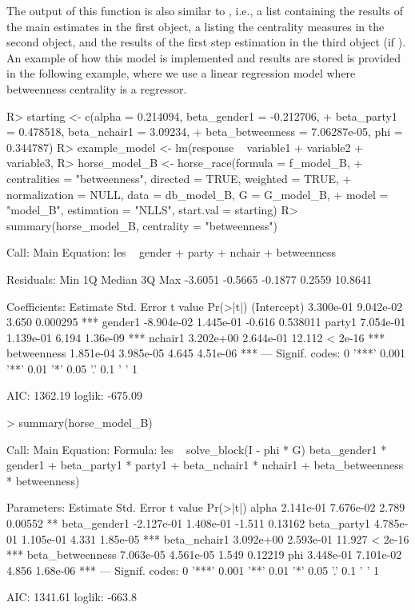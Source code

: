 \documentclass[nojss]{jss}
\begin{document}
	The output of this function is also similar to , i.e., a list containing the results of the main estimates in the first object, a  listing the centrality measures in the second object, and the results of the first step estimation in the third object (if ). An example of how this model is implemented and results are stored is provided in the following example, where we use a linear regression model where betweenness centrality is a regressor.
	
	\begin{CodeChunk}
		\begin{CodeInput}
			R> starting <- c(alpha = 0.214094, beta_gender1 = -0.212706,
			+    beta_party1 = 0.478518, beta_nchair1 = 3.09234,
			+    beta_betweenness = 7.06287e-05, phi = 0.344787)
			R> example_model <- lm(response ~ variable1 + variable2 + variable3, 
			R> horse_model_B <- horse_race(formula = f_model_B, 
			+    centralities = "betweenness", directed = TRUE, weighted = TRUE, 
			+    normalization = NULL, data = db_model_B, G = G_model_B,
			+    model = "model_B", estimation = "NLLS", start.val = starting)
			R> summary(horse_model_B, centrality = "betweenness")
		\end{CodeInput}
		\begin{CodeOutput}
			Call:
			Main Equation:  les ~ gender + party + nchair + betweenness
			
			Residuals:
			Min      1Q  Median      3Q     Max 
			-3.6051 -0.5665 -0.1877  0.2559 10.8641 
			
			Coefficients:
			Estimate Std. Error t value Pr(>|t|)    
			(Intercept)  3.300e-01  9.042e-02   3.650 0.000295 ***
			gender1     -8.904e-02  1.445e-01  -0.616 0.538011    
			party1       7.054e-01  1.139e-01   6.194 1.36e-09 ***
			nchair1      3.202e+00  2.644e-01  12.112  < 2e-16 ***
			betweenness  1.851e-04  3.985e-05   4.645 4.51e-06 ***
			---
			Signif. codes:  0 '***' 0.001 '**' 0.01 '*' 0.05 '.' 0.1 ' ' 1
			
			AIC: 1362.19  loglik: -675.09
		\end{CodeOutput}
		\begin{CodeInput}
			> summary(horse_model_B)
		\end{CodeInput}
		\begin{CodeOutput}
			Call:
			Main Equation:
			Formula: les ~ solve_block(I - phi * G) %
			beta_gender1 * gender1 + beta_party1 * party1 + 
			beta_nchair1 * nchair1 + beta_betweenness * betweenness)
			
			Parameters:
			Estimate Std. Error t value Pr(>|t|)    
			alpha             2.141e-01  7.676e-02   2.789  0.00552 ** 
			beta_gender1     -2.127e-01  1.408e-01  -1.511  0.13162    
			beta_party1       4.785e-01  1.105e-01   4.331 1.85e-05 ***
			beta_nchair1      3.092e+00  2.593e-01  11.927  < 2e-16 ***
			beta_betweenness  7.063e-05  4.561e-05   1.549  0.12219    
			phi               3.448e-01  7.101e-02   4.856 1.68e-06 ***
			---
			Signif. codes:  0 '***' 0.001 '**' 0.01 '*' 0.05 '.' 0.1 ' ' 1
			
			AIC: 1341.61  loglik: -663.8
		\end{CodeOutput}
	\end{CodeChunk}
	
\end{document}
